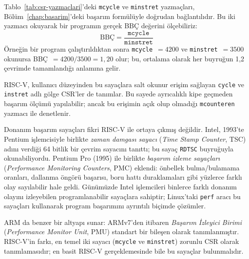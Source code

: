 \begin{bilginot}
Tablo~\ref{tab:csr-yazmaclari}'deki \texttt{mcycle} ve \texttt{minstret} yazmaçları, Bölüm~\ref{chap:basarim}'deki başarım formülüyle doğrudan bağlantılıdır. Bu iki yazmacı okuyarak bir programın gerçek BBÇ değerini ölçebiliriz:
\[
\text{BBÇ} = \frac{\texttt{mcycle}}{\texttt{minstret}}
\]
Örneğin bir program çalıştırıldıktan sonra \texttt{mcycle}~$= 4200$ ve \texttt{minstret}~$= 3500$ okunursa BBÇ~$= 4200 / 3500 = 1{,}20$ olur; bu, ortalama olarak her buyruğun 1,2 çevrimde tamamlandığı anlamına gelir.

RISC-V, kullanıcı düzeyinden bu sayaçlara salt okunur erişim sağlayan \texttt{cycle} ve \texttt{instret} adlı gölge CSR'ler de tanımlar. Bu sayede ayrıcalıklı kipe geçmeden başarım ölçümü yapılabilir; ancak bu erişimin açık olup olmadığı \texttt{mcounteren} yazmacı ile denetlenir.

Donanım başarım sayaçları fikri RISC-V ile ortaya çıkmış değildir. Intel, 1993'te Pentium işlemcisiyle birlikte \emph{zaman damgası sayacı} (\emph{Time Stamp Counter}, TSC) adını verdiği 64 bitlik bir çevrim sayacını tanıttı; bu sayaç \texttt{RDTSC} buyruğuyla okunabiliyordu. Pentium Pro (1995) ile birlikte \emph{başarım izleme sayaçları} (\emph{Performance Monitoring Counters}, PMC) eklendi: önbellek bulma/bulamama oranları, dallanma öngörü başarısı, boru hattı duraklamaları gibi yüzlerce farklı olay sayılabilir hale geldi. Günümüzde Intel işlemcileri binlerce farklı donanım olayını izleyebilen programlanabilir sayaçlara sahiptir; Linux'taki \texttt{perf} aracı bu sayaçları kullanarak program başarımını ayrıntılı biçimde çözümler.

ARM da benzer bir altyapı sunar: ARMv7'den itibaren \emph{Başarım İzleyici Birimi} (\emph{Performance Monitor Unit}, PMU) standart bir bileşen olarak tanımlanmıştır. RISC-V'in farkı, en temel iki sayacı (\texttt{mcycle} ve \texttt{minstret}) zorunlu CSR olarak tanımlamasıdır; en basit RISC-V gerçeklemesinde bile bu sayaçlar bulunmalıdır.
\end{bilginot}

